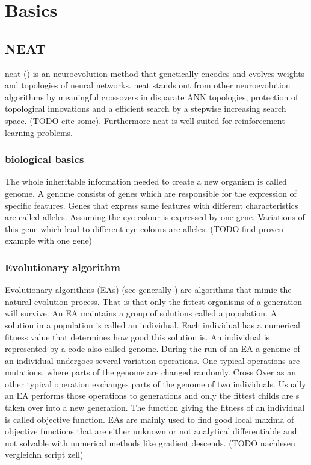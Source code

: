 
\chapter{Basics}\label{Basics}


\section{NEAT}\label{NEAT} %
\Gls{neat} (\cite{NEAT}) is an neuroevolution method that genetically encodes and evolves weights and topologies of neural networks. \gls{neat} stands out from other neuroevolution algorithms by meaningful crossovers in disparate ANN topologies, protection of topological innovations and a efficient search by a stepwise increasing search space. (TODO cite some). Furthermore \gls{neat} is well suited for reinforcement learning problems. 
\subsection{biological basics} 
The whole inheritable information needed to create a new organism is called genome. A genome consists of genes which are responsible for the expression of specific features. Genes that express same features with  different characteristics are called alleles. Assuming the eye colour is expressed by one gene.  Variations of this gene which lead to different eye colours are alleles. (TODO find proven example with one gene)
\subsection{Evolutionary algorithm} %
Evolutionary algorithms (EAs) (see generally \cite{book:IntroductionEA}) are algorithms that mimic the natural evolution process. That is that only the fittest organisms of a generation will survive. An EA maintains a group of solutions called a population. A solution in a population is called an individual. Each individual has a numerical fitness value that determines how good this solution is. An individual is represented by a code also called genome. During the run of an EA a genome of an individual undergoes several variation operations. One typical operations are mutations, where parts of the genome are changed randomly. Cross Over as an other typical operation exchanges parts of the genome of two individuals. Usually an EA performs those operations to generations and only the fittest childs are s taken over into a new generation. The function giving the fitness of an individual is called objective function. EAs are mainly used to find good local maxima of objective functions that are either unknown or not analytical differentiable and not solvable with numerical methods like gradient descends.  (TODO nachlesen vergleichn script zell)


